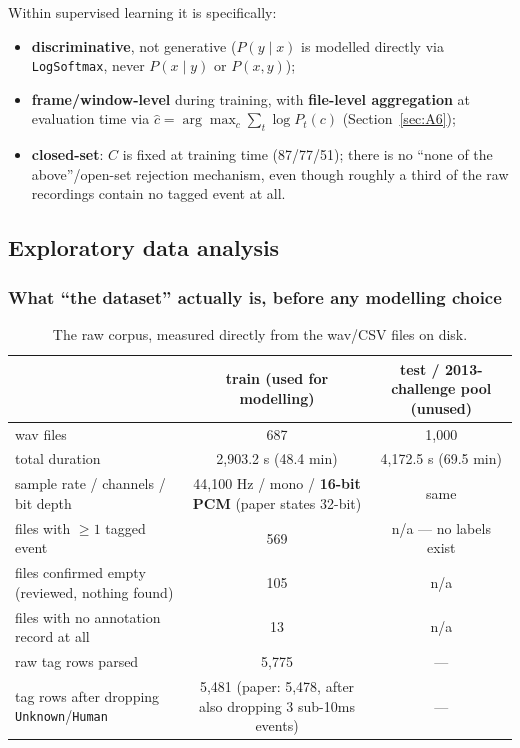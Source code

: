 \documentclass[11pt]{article}
\begin{document}
Within supervised learning it is specifically:
\begin{itemize}[nosep]
\item \textbf{discriminative}, not generative ($P(y\mid x)$ is modelled
  directly via \texttt{LogSoftmax}, never $P(x\mid y)$ or $P(x,y)$);
\item \textbf{frame/window-level} during training, with \textbf{file-level
  aggregation} at evaluation time via $\hat c = \arg\max_c \sum_t \log P_t(c)$
  (Section~\ref{sec:A6});
\item \textbf{closed-set}: $C$ is fixed at training time (87/77/51); there is
  no ``none of the above''/open-set rejection mechanism, even though roughly
  a third of the raw recordings contain no tagged event at all.
\end{itemize}

\subsection{Exploratory data analysis}
\label{sec:A5}

\subsubsection{What ``the dataset'' actually is, before any modelling choice}
\label{sec:A51}

\begin{table}[h]
\centering
\caption{The raw corpus, measured directly from the wav/CSV files on disk.}
\label{tab:corpus}
\begin{tabularx}{\textwidth}{Y c c}
\toprule
 & train (used for modelling) & test / 2013-challenge pool (unused) \\
\midrule
wav files & 687 & 1{,}000 \\
total duration & 2{,}903.2 s (48.4 min) & 4{,}172.5 s (69.5 min) \\
sample rate / channels / bit depth & 44{,}100 Hz / mono / \textbf{16-bit PCM} (paper states 32-bit) & same \\
files with $\geq 1$ tagged event & 569 & n/a --- no labels exist \\
files confirmed empty (reviewed, nothing found) & 105 & n/a \\
files with no annotation record at all & 13 & n/a \\
raw tag rows parsed & 5{,}775 & --- \\
tag rows after dropping \texttt{Unknown}/\texttt{Human} & 5{,}481 (paper: 5{,}478, after also dropping 3 sub-10ms events) & --- \\
\bottomrule
\end{tabularx}
\end{table}
\end{document}

